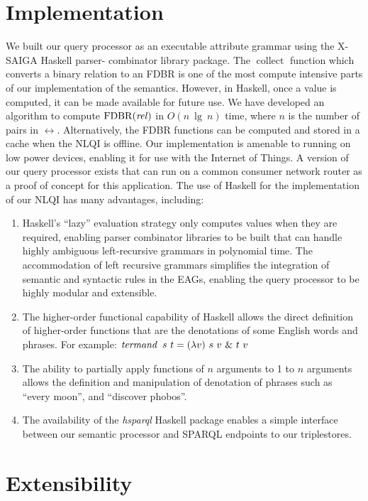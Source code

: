 \documentclass[../main.tex]{subfiles}
\begin{document}
\begin{refsection}
\section{Implementation}
\label{ext:implementation}
We built our query processor as an executable attribute grammar using the X-SAIGA Haskell parser-
combinator library package. %
The $\operatorname{collect}$ function which converts a binary relation to an FDBR is one of the most
compute intensive parts of our implementation of the semantics. However, in Haskell, once a value is
computed, it can be made available for future use. We have developed an algorithm to compute
$\operatorname{FDBR}({\operatorname{\mathit{rel}}})$ in $O(n\ \operatorname{lg}\ n)$ time, where $n$ is the number of pairs in $\rel$.
Alternatively, the FDBR functions can be computed and stored in a cache when the NLQI is offline.
Our implementation is amenable to running on low power devices, enabling it for use with the Internet of Things. A version of our query processor exists that can run on a common consumer network router as a proof of concept for this application.
The use of Haskell for the implementation of our NLQI has many advantages, including:
\begin{enumerate}
	\setlength\itemsep{0em}
	\item Haskell's ``lazy'' evaluation strategy only computes values when they are required, enabling parser combinator
	libraries to be built that can handle highly ambiguous left-recursive grammars in polynomial time. The accommodation of left recursive
	grammars simplifies the integration of semantic and syntactic rules in the EAGs, enabling the query processor to be highly modular and extensible.
	\item The higher-order functional capability of Haskell allows the direct definition of higher-order
	functions that are the denotations of some English words and phrases. For example: $ \opit{termand}\ s\ t = (\lambda v)\ s\ v\ \&\ t\ v  $
	\item The ability to partially apply functions of $n$ arguments to 1 to $n$ arguments allows the
	definition and manipulation of denotation of phrases such as ``every moon'', and ``discover
	phobos''.
	\item The availability of the \textit{hsparql} \cite{hsparql} Haskell package enables a simple interface between our
	semantic processor and SPARQL endpoints to our triplestores.
\end{enumerate}

\section{Extensibility}
\label{ext:extensible}


\end{refsection}
\end{document}
